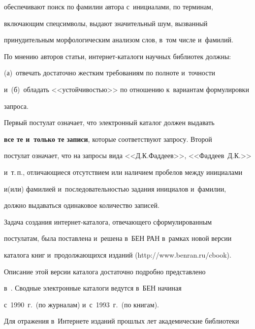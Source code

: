 обеспечивают поиск по фамилии автора с~инициалами, по терминам, 


включающим спецсимволы, выдают значительный шум, вызванный 


принудительным морфологическим анализом слов, в~том числе и~фамилий.


  


  По мнению авторов статьи, интернет-каталоги научных библиотек должны: 


(а)~отвечать достаточно жестким требованиям по полноте и~точности 


и~(б)~обладать <<устойчивостью>> по отношению к~вариантам формулировки 


запроса. 


  


  Первый постулат означает, что электронный каталог должен выдавать 


\textbf{все те и~только те записи}, которые соответствуют запросу. Второй 


постулат означает, что на запросы вида <<Д.К.Фаддеев>>, <<Фаддеев~Д.К.>> 


и~т.\,п., отличающиеся отсутствием или наличием пробелов между инициалами 


и(или) фамилией и~последовательностью задания инициалов и~фамилии, 


должно выдаваться одинаковое количество записей.


  


  Задача создания интернет-каталога, отвечающего сформулированным 


постулатам, была поставлена и~решена в~БЕН РАН в~рамках новой версии 


каталога книг и~продолжающихся изданий ({\sf http://www.benran.ru/cbook}). 


Описание этой версии каталога достаточно подробно представлено  


в~\cite{20-vla}. Сводные электронные каталоги ведутся в~БЕН начиная 


с~1990~г.\ (по журналам) и~с~1993~г.\ (по книгам). 


{





}


  


  Для отражения в~Интернете изданий прошлых лет академические библиотеки 


